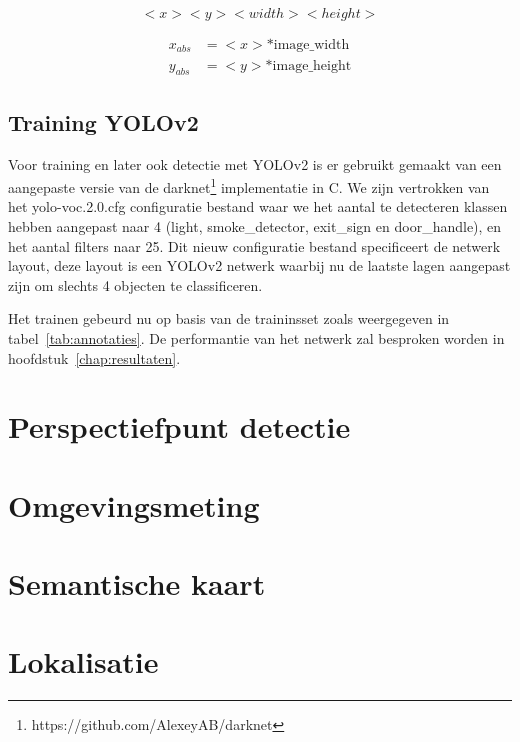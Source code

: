 \begin{equation} \label{eq:yolo}
  <x> <y> <width> <height>
\end{equation}

\begin{equation} \label{eq:yolo_abs}
    \begin{split}
        x_{abs} &= <x> *  \mathrm{image\_width} \\
        y_{abs} &= <y> * \mathrm{image\_height}
    \end{split}
\end{equation}

\subsection{Training YOLOv2}

Voor training en later ook detectie met YOLOv2 is er gebruikt gemaakt van een aangepaste versie van de darknet\footnote{https://github.com/AlexeyAB/darknet} implementatie in C.
We zijn vertrokken van het yolo-voc.2.0.cfg configuratie bestand waar we het aantal te detecteren klassen hebben aangepast naar 4 (light, smoke\_detector, exit\_sign en door\_handle), en het aantal filters naar 25.
Dit nieuw configuratie bestand specificeert de netwerk layout, deze layout is een YOLOv2 netwerk waarbij nu de laatste lagen aangepast zijn om slechts 4 objecten te classificeren.

Het trainen gebeurd nu op basis van de traininsset zoals weergegeven in tabel~\ref{tab:annotaties}. De performantie van het netwerk zal besproken worden in hoofdstuk~\ref{chap:resultaten}.
\section{Perspectiefpunt detectie}

\section{Omgevingsmeting}

\section{Semantische kaart}\label{sec:sem_kaart}

\section{Lokalisatie}